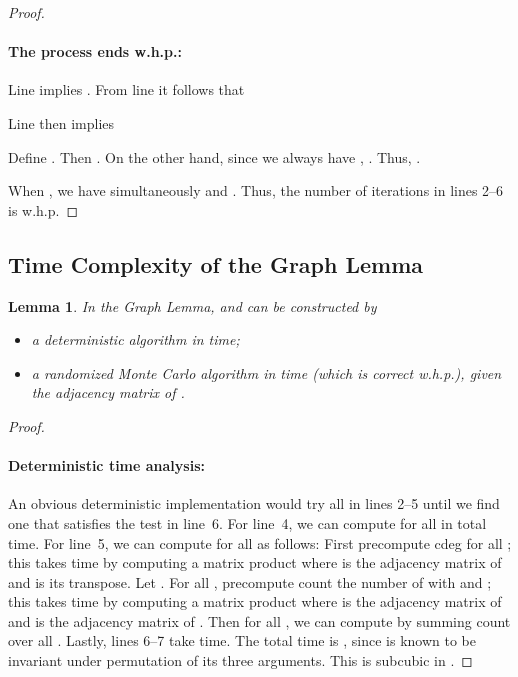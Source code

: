 \documentclass[11pt]{article}
\newtheorem{lemma}[theorem]{Lemma}
\begin{document}
{\begin{proof}
\paragraph{The process ends w.h.p.:}

Line  implies . From line  it follows that

Line  then implies


Define .
Then .
On the other hand, since we always have ,
.
Thus, .

When , we have simultaneously
 and .
Thus, the number of iterations in lines 2--6 is  w.h.p.
\end{proof}


\subsection{Time Complexity of the Graph Lemma}\label{sec-graph-time}


\begin{lemma}\label{lem-graph-runtime}
In the Graph Lemma,  and  can be constructed by

\begin{itemize}
\item
a deterministic algorithm in  time;
\item
a randomized Monte Carlo algorithm in  time
(which is correct w.h.p.), given the adjacency matrix of .
\end{itemize}
\end{lemma}

\begin{proof}\


\paragraph{Deterministic time analysis:}
An obvious deterministic implementation would try
all  in lines 2--5 until we find one that satisfies
the test in line~6.
For line~4, we can compute  for all  in
 total time.
For line~5, we can compute  for all  as follows:
First precompute cdeg for all ; this takes
 time by
computing a matrix product  where
 is the adjacency matrix of 
and  is its transpose.
Let .
For all , precompute count
the number of  with  and ;
this takes  time by
computing a matrix product  where
 is the adjacency matrix of  and
 is the adjacency matrix of .
Then for all , we can compute  by summing
count over all .
Lastly, lines 6--7 take  time.
The total time is , since 
is known to be invariant under permutation of its three arguments.
This is subcubic in .



\end{proof}}
\end{document}
